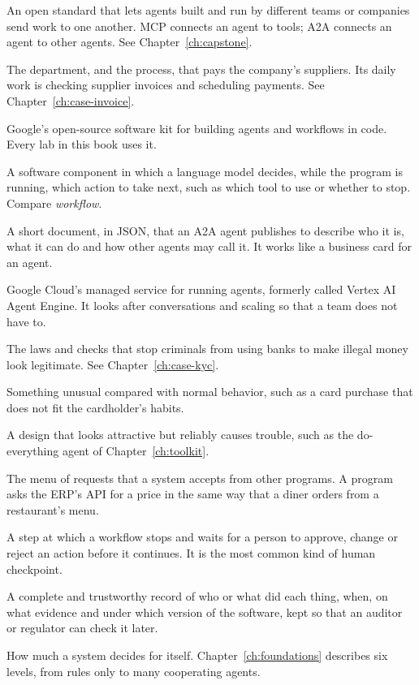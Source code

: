 \newcommand{\gterm}[1]{\item[#1]}
\begin{description}[style=nextline, leftmargin=1.2em, itemsep=4pt, font=\normalfont\bfseries\sffamily\small]

\gterm{A2A (Agent2Agent)} An open standard that lets agents built and run by different teams or companies send work to one another. MCP connects an agent to tools; A2A connects an agent to other agents. See Chapter~\ref{ch:capstone}.
\gterm{Accounts payable (AP)} The department, and the process, that pays the company's suppliers. Its daily work is checking supplier invoices and scheduling payments. See Chapter~\ref{ch:case-invoice}.
\gterm{ADK (Agent Development Kit)} Google's open-source software kit for building agents and workflows in code. Every lab in this book uses it.
\gterm{Agent} A software component in which a language model decides, while the program is running, which action to take next, such as which tool to use or whether to stop. Compare \emph{workflow}.
\gterm{Agent card} A short document, in JSON, that an A2A agent publishes to describe who it is, what it can do and how other agents may call it. It works like a business card for an agent.
\gterm{Agent Runtime} Google Cloud's managed service for running agents, formerly called Vertex AI Agent Engine. It looks after conversations and scaling so that a team does not have to.
\gterm{AML (anti-money laundering)} The laws and checks that stop criminals from using banks to make illegal money look legitimate. See Chapter~\ref{ch:case-kyc}.
\gterm{Anomaly} Something unusual compared with normal behavior, such as a card purchase that does not fit the cardholder's habits.
\gterm{Anti-pattern} A design that looks attractive but reliably causes trouble, such as the do-everything agent of Chapter~\ref{ch:toolkit}.
\gterm{API (application programming interface)} The menu of requests that a system accepts from other programs. A program asks the ERP's API for a price in the same way that a diner orders from a restaurant's menu.
\gterm{Approval gate} A step at which a workflow stops and waits for a person to approve, change or reject an action before it continues. It is the most common kind of human checkpoint.
\gterm{Audit trail} A complete and trustworthy record of who or what did each thing, when, on what evidence and under which version of the software, kept so that an auditor or regulator can check it later.
\gterm{Autonomy} How much a system decides for itself. Chapter~\ref{ch:foundations} describes six levels, from rules only to many cooperating agents.


\end{description}
